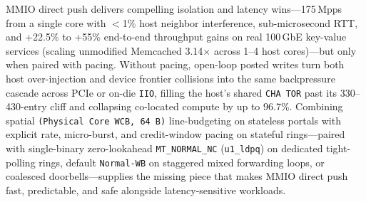 MMIO direct push delivers compelling isolation and latency wins---175\,Mpps from a single core with $<$1\% host neighbor interference, sub-microsecond RTT, and +22.5\% to +55\% end-to-end throughput gains on real 100\,GbE key-value services (scaling unmodified Memcached 3.14$\times$ across 1--4 host cores)---but only when paired with pacing. Without pacing, open-loop posted writes turn both host over-injection and device frontier collisions into the same backpressure cascade across PCIe or on-die \texttt{IIO}, filling the host's shared \texttt{CHA TOR} past its 330--430-entry cliff and collapsing co-located compute by up to 96.7\%. Combining spatial \texttt{(Physical Core WCB, 64\,B)} line-budgeting on stateless portals with explicit rate, micro-burst, and credit-window pacing on stateful rings---paired with single-binary zero-lookahead \texttt{MT\_NORMAL\_NC} (\texttt{u1\_ldpq}) on dedicated tight-polling rings, default \texttt{Normal-WB} on staggered mixed forwarding loops, or coalesced doorbells---supplies the missing piece that makes MMIO direct push fast, predictable, and safe alongside latency-sensitive workloads.
